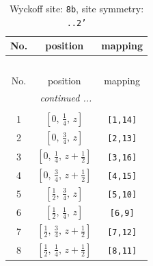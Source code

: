 \documentclass[fleqn,8pt]{jsarticle}
\begin{document}
\begin{longtable}{ccc}
\caption{Wyckoff site: {\tt 8b}, site symmetry: {\tt ..2'}}
 \\
 \hline \hline
No. & position & mapping \\ \hline \endfirsthead

\multicolumn{2}{l}{\tablename\ \thetable{}} \\
 \hline \hline
No. & position & mapping \\ \hline \endhead

 \hline \hline
\multicolumn{2}{r}{\footnotesize\it continued ...} \\ \endfoot

 \hline \hline
\multicolumn{2}{r}{} \\ \endlastfoot

1 & $\left[ 0,\, \frac{1}{4},\, z \right]$ & {\tt [1,14]} \\ \hline
2 & $\left[ 0,\, \frac{3}{4},\, z \right]$ & {\tt [2,13]} \\ \hline
3 & $\left[ 0,\, \frac{1}{4},\, z + \frac{1}{2} \right]$ & {\tt [3,16]} \\ \hline
4 & $\left[ 0,\, \frac{3}{4},\, z + \frac{1}{2} \right]$ & {\tt [4,15]} \\ \hline
5 & $\left[ \frac{1}{2},\, \frac{3}{4},\, z \right]$ & {\tt [5,10]} \\ \hline
6 & $\left[ \frac{1}{2},\, \frac{1}{4},\, z \right]$ & {\tt [6,9]} \\ \hline
7 & $\left[ \frac{1}{2},\, \frac{3}{4},\, z + \frac{1}{2} \right]$ & {\tt [7,12]} \\ \hline
8 & $\left[ \frac{1}{2},\, \frac{1}{4},\, z + \frac{1}{2} \right]$ & {\tt [8,11]} \\
\end{longtable}
\renewcommand{\arraystretch}{1.2}
\end{document}
